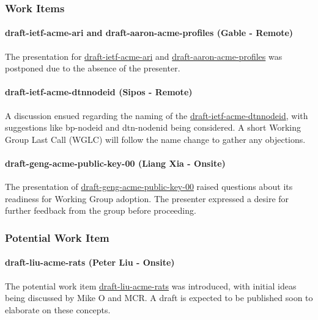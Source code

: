 \documentclass{article}
\begin{document}
\subsubsection{Work Items}

\paragraph{draft-ietf-acme-ari and draft-aaron-acme-profiles (Gable - Remote)}

The presentation for \href{https://datatracker.ietf.org/doc/html/draft-ietf-acme-ari}{draft-ietf-acme-ari} and \href{https://datatracker.ietf.org/doc/html/draft-aaron-acme-profiles}{draft-aaron-acme-profiles} was postponed due to the absence of the presenter.

\paragraph{draft-ietf-acme-dtnnodeid (Sipos - Remote)}

A discussion ensued regarding the naming of the \href{https://datatracker.ietf.org/doc/html/draft-ietf-acme-dtnnodeid}{draft-ietf-acme-dtnnodeid}, with suggestions like bp-nodeid and dtn-nodenid being considered. A short Working Group Last Call (WGLC) will follow the name change to gather any objections.

\paragraph{draft-geng-acme-public-key-00 (Liang Xia - Onsite)}

The presentation of \href{https://datatracker.ietf.org/doc/html/draft-geng-acme-public-key-00}{draft-geng-acme-public-key-00} raised questions about its readiness for Working Group adoption. The presenter expressed a desire for further feedback from the group before proceeding.

\subsubsection{Potential Work Item}

\paragraph{draft-liu-acme-rats (Peter Liu - Onsite)}

The potential work item \href{https://datatracker.ietf.org/doc/html/draft-liu-acme-rats}{draft-liu-acme-rats} was introduced, with initial ideas being discussed by Mike O and MCR. A draft is expected to be published soon to elaborate on these concepts.
\end{document}
